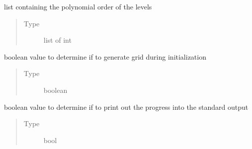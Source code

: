 \documentclass[letterpaper,10pt,english,openany,oneside]{sphinxmanual}
\begin{document}
\begin{fulllineitems}
\begin{fulllineitems}
\begin{quote}
\begin{description}
\end{description}\end{quote}

\end{fulllineitems}


\begin{fulllineitems}
\label{\detokenize{pygpc:pygpc.Grid.SparseGrid.order_sequence}}
list containing the polynomial order of the levels
\begin{quote}\begin{description}
\item[{Type}] \leavevmode
list of int

\end{description}\end{quote}

\end{fulllineitems}


\begin{fulllineitems}
\label{\detokenize{pygpc:pygpc.Grid.SparseGrid.make_grid}}
boolean value to determine if to generate grid during initialization
\begin{quote}\begin{description}
\item[{Type}] \leavevmode
boolean

\end{description}\end{quote}

\end{fulllineitems}


\begin{fulllineitems}
\label{\detokenize{pygpc:pygpc.Grid.SparseGrid.verbose}}
boolean value to determine if to print out the progress into the standard output
\begin{quote}\begin{description}
\item[{Type}] \leavevmode
bool


\end{description}
\end{quote}
\end{fulllineitems}
\end{fulllineitems}
\end{document}
